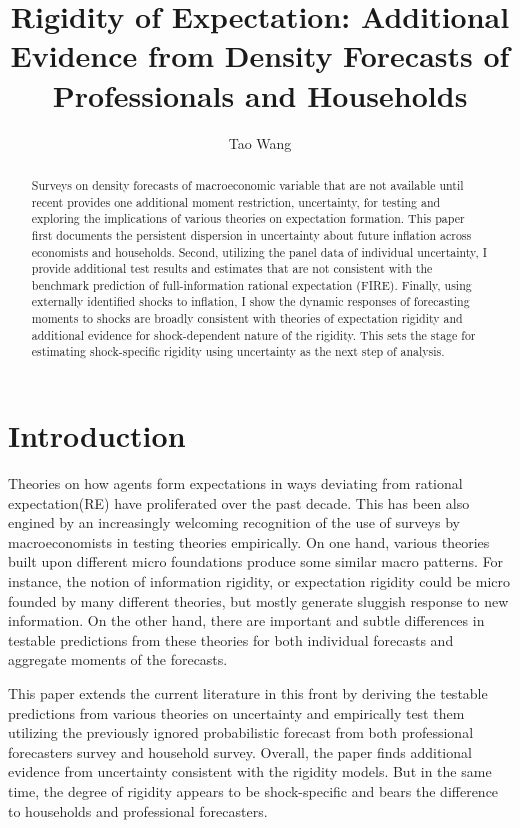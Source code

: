 \documentclass[]{article}
\title{Rigidity of Expectation: Additional Evidence from Density Forecasts of Professionals and Households}
\author{Tao Wang}
\begin{document}
	
	\maketitle
	
	\begin{abstract}
		Surveys on density forecasts of macroeconomic variable that are not available until recent provides one additional moment restriction, uncertainty, for testing and exploring the implications of various theories on expectation formation. This paper first documents the persistent dispersion in uncertainty about future inflation across economists and households. Second,  utilizing the panel data of individual uncertainty, I provide additional test results and estimates that are not consistent with the benchmark prediction of full-information rational expectation (FIRE). Finally, using externally identified shocks to inflation, I show the dynamic responses of forecasting moments to shocks are broadly consistent with theories of expectation rigidity and additional evidence for shock-dependent nature of the rigidity.  This sets the stage for estimating shock-specific rigidity using uncertainty as the next step of analysis.  
		
	\end{abstract}
	
	\newpage 
	
	\section{Introduction}
	
	
	Theories on how agents form expectations in ways deviating from rational expectation(RE) have proliferated over the past decade. This has been also engined by an increasingly welcoming recognition of the use of surveys by macroeconomists in testing theories empirically.  On one hand, various theories built upon different micro foundations produce some similar macro patterns. For instance, the notion of information rigidity, or expectation rigidity could be micro founded by many different theories, but mostly generate sluggish response to new information.  On the other hand, there are important and subtle differences in testable predictions from these theories for both individual forecasts and aggregate moments of the forecasts. 
	
	This paper extends the current literature in this front by deriving the testable predictions from various theories on uncertainty and empirically test them utilizing the previously ignored probabilistic forecast from both professional forecasters survey and household survey. Overall, the paper finds additional evidence from uncertainty consistent with the rigidity models. But in the same time, the degree of rigidity appears to be shock-specific and bears the difference to households and professional forecasters. 
	
\end{document}
